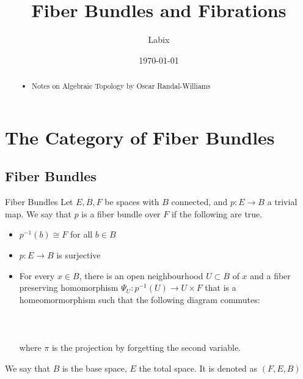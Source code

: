 \documentclass[a4paper]{article}
\title{Fiber Bundles and Fibrations}
\author{Labix}
\date{\today}
\begin{document}
\maketitle
\begin{abstract}
\begin{itemize}
\item Notes on Algebraic Topology by Oscar Randal-Williams
\end{itemize}
\end{abstract}
\pagebreak
\tableofcontents

\pagebreak
\section{The Category of Fiber Bundles}
\subsection{Fiber Bundles}
\begin{defn}{Fiber Bundles}{} Let $E,B,F$ be spaces with $B$ connected, and $p:E\to B$ a trivial map. We say that $p$ is a fiber bundle over $F$ if the following are true. 
\begin{itemize}
\item $p^{-1}(b)\cong F$ for all $b\in B$
\item $p:E\to B$ is surjective
\item For every $x\in B$, there is an open neighbourhood $U\subset B$ of $x$ and a fiber preserving homomorphism $\Psi_U:p^{-1}(U)\to U\times F$ that is a homeomormorphism such that the following diagram commutes: \\~\\
\\~\\
where $\pi$ is the projection by forgetting the second variable. 
\end{itemize}
We say that $B$ is the base space, $E$ the total space. It is denoted as $(F,E,B)$
\end{defn}
\end{document}

